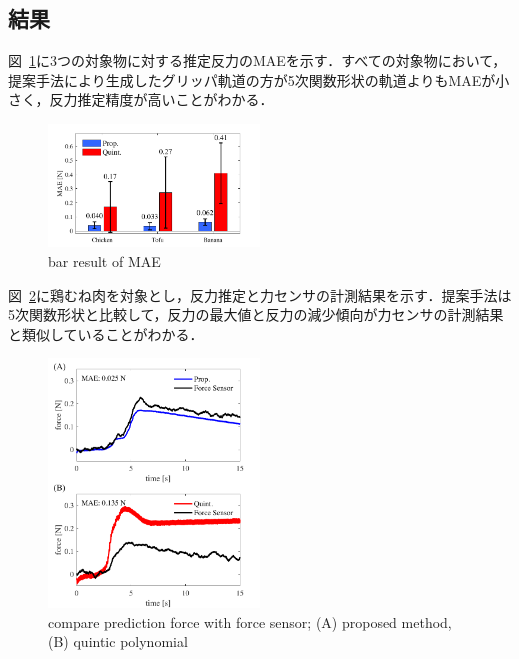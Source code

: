 \documentclass[a4paper]{jarticle}
\begin{document}
\subsection{結果}
図~\ref{fig:bar_result}に3つの対象物に対する推定反力のMAEを示す．すべての対象物において，提案手法により生成したグリッパ軌道の方が5次関数形状の軌道よりもMAEが小さく，反力推定精度が高いことがわかる．
\begin{figure}[htbp]
    \centering
    \includegraphics[width=0.5\textwidth]{bar_result.pdf}
    \caption{bar result of MAE}  
    \label{fig:bar_result}
\end{figure}
図~\ref{fig:prop_quint}に鶏むね肉を対象とし，反力推定と力センサの計測結果を示す．提案手法は5次関数形状と比較して，反力の最大値と反力の減少傾向が力センサの計測結果と類似していることがわかる．
\begin{figure}[htbp]
    \centering
    \includegraphics[width=0.5\textwidth]{prop_quint.pdf}
    \captionsetup{width=0.9\linewidth} %
    \caption{compare prediction force with force sensor; (A) proposed method, (B) quintic polynomial}
    \label{fig:prop_quint}
\end{figure}
\end{document}
